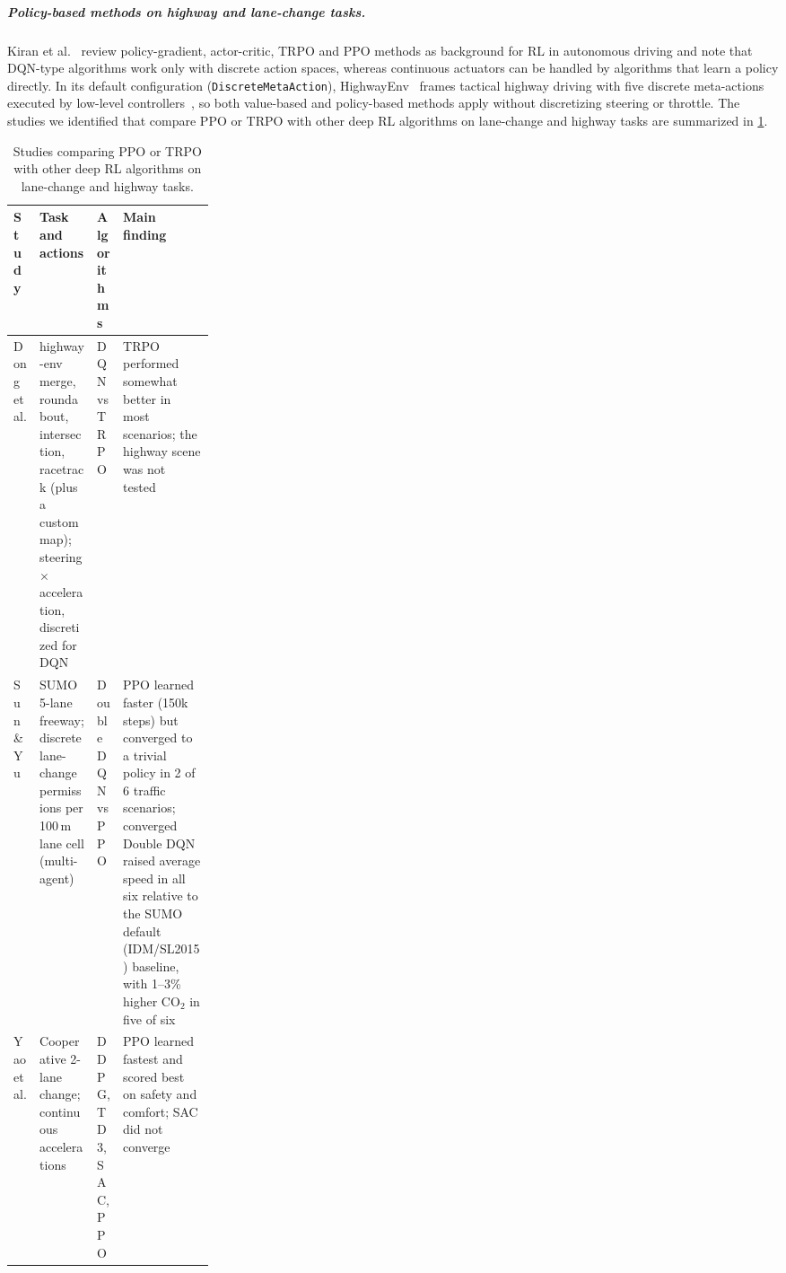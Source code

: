 \subparagraph{Policy-based methods on highway and lane-change tasks.}
Kiran et al.~\cite{kiran2022drl} review policy-gradient, actor-critic, TRPO and PPO methods as background for RL in
autonomous driving and note that DQN-type algorithms work only with discrete action spaces, whereas continuous
actuators can be handled by algorithms that learn a policy directly. In its default configuration
(\texttt{DiscreteMetaAction}), HighwayEnv~\cite{highway-env} frames tactical highway driving with five discrete
meta-actions executed by low-level controllers~\cite{leurent2020thesis}, so both value-based and policy-based methods
apply without discretizing steering or throttle. The studies we identified that compare PPO or TRPO with other deep RL
algorithms on lane-change and highway tasks are summarized in \cref{tab:ppo-sota-studies}.

\begin{table}[H]
  \centering
  \small
  \caption{Studies comparing PPO or TRPO with other deep RL algorithms on lane-change and highway tasks.}
  \label{tab:ppo-sota-studies}
  \begin{tabularx}{\linewidth}{@{}>{\raggedright\arraybackslash}p{0.13\linewidth}>{\raggedright\arraybackslash}X>{\raggedright\arraybackslash}p{0.13\linewidth}>{\raggedright\arraybackslash}X@{}}
    \toprule
    Study & Task and actions & Algorithms & Main finding \\
    \midrule
    Dong et al.~\cite{dong2023comprehensive}
      & highway-env merge, roundabout, intersection, racetrack (plus a custom map); steering $\times$ acceleration,
        discretized for DQN
      & DQN vs TRPO
      & TRPO performed somewhat better in most scenarios; the highway scene was not tested \\
    Sun \& Yu~\cite{sun2024lanechange}
      & SUMO 5-lane freeway; discrete lane-change permissions per 100\,m lane cell (multi-agent)
      & Double DQN vs PPO
      & PPO learned faster (150k steps) but converged to a trivial policy in 2 of 6 traffic scenarios; converged Double
        DQN raised average speed in all six relative to the SUMO default (IDM/SL2015) baseline, with 1--3\% higher
        CO$_2$ in five of six \\
    Yao et al.~\cite{yao2024comparison}
      & Cooperative 2-lane change; continuous accelerations
      & DDPG, TD3, SAC, PPO
      & PPO learned fastest and scored best on safety and comfort; SAC did not converge \\
    \bottomrule
  \end{tabularx}
\end{table}


